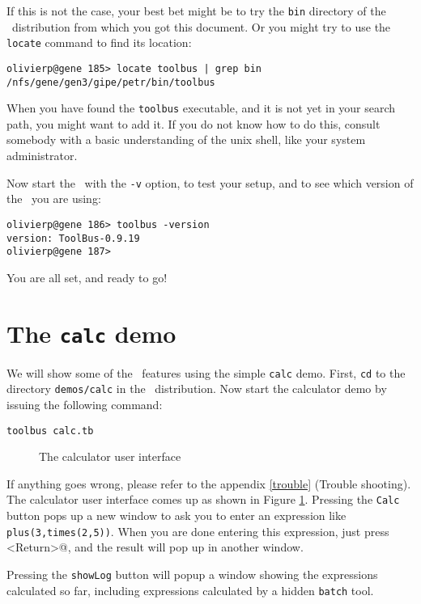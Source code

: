 \documentclass[a4,twoside,noweb]{article} %
\begin{document}
If this is not the case, your best bet might be to try the {\tt bin}
directory of the \TB\ distribution from which you got this document.
Or you might try to use the {\tt locate} command
to find its location:
\begin{verbatim}
olivierp@gene 185> locate toolbus | grep bin
/nfs/gene/gen3/gipe/petr/bin/toolbus
\end{verbatim}

When you have found the {\tt toolbus} executable, and it is not yet
in your search path, you might want to add it. If you do not know how
to do this, consult somebody with a basic understanding of the
unix shell, like your system administrator.

Now start the \TB\ with the {\tt -v} option, to test your setup,
and to see which version of the \TB\ you are using:

\begin{verbatim}
olivierp@gene 186> toolbus -version
version: ToolBus-0.9.19
olivierp@gene 187>
\end{verbatim}

You are all set, and ready to go!

\section{The {\tt calc} demo}

We will show some of the \TB\ features using the simple {\tt calc} demo.
First, {\tt cd} to the directory {\tt demos/calc} in the \TB\ distribution.
Now start the calculator demo by issuing the following command:

\begin{verbatim}
toolbus calc.tb
\end{verbatim}

\begin{figure}[htb]
\centerline{}
\caption{The calculator user interface}
\label{calc-ui}
\end{figure}

If anything goes wrong, please refer to the appendix 
\ref{trouble} (Trouble shooting).
The calculator user interface comes up as shown in Figure \ref{calc-ui}.
Pressing the {\tt Calc} button pops up a new window to ask you to enter
an expression like {\tt plus(3,times(2,5))}.
When you are done entering this expression, just press 
\verb@<Return>@, and the result will pop up in another window.

Pressing the {\tt showLog} button will popup a window showing the
expressions calculated so far, including expressions calculated
by a hidden {\tt batch} tool.
\end{document}
